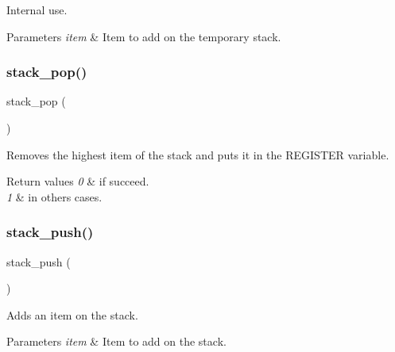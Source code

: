 Internal use. 


\begin{DoxyParams}{Parameters}
{\em item} & Item to add on the temporary stack. \\
\hline
\end{DoxyParams}
\mbox{\label{group__stack_gafcec48f7160b75a50d6a5ff973915768}} 
\subsubsection{\texorpdfstring{stack\+\_\+pop()}{stack\_pop()}}
{\footnotesize\ttfamily stack\+\_\+pop (\begin{DoxyParamCaption}{ }\end{DoxyParamCaption})}



Removes the highest item of the stack and puts it in the \textquotesingle{}R\+E\+G\+I\+S\+T\+ER\textquotesingle{} variable. 


\begin{DoxyRetVals}{Return values}
{\em 0} & if succeed. \\
\hline
{\em 1} & in others cases. \\
\hline
\end{DoxyRetVals}
\mbox{\label{group__stack_ga6b8010e6e027472c4e17b4d8bdfbb9f2}} 
\subsubsection{\texorpdfstring{stack\+\_\+push()}{stack\_push()}}
{\footnotesize\ttfamily stack\+\_\+push (\begin{DoxyParamCaption}\item[{item}]{ }\end{DoxyParamCaption})}



Adds an item on the stack. 


\begin{DoxyParams}{Parameters}
{\em item} & Item to add on the stack. \\
\hline
\end{DoxyParams}
